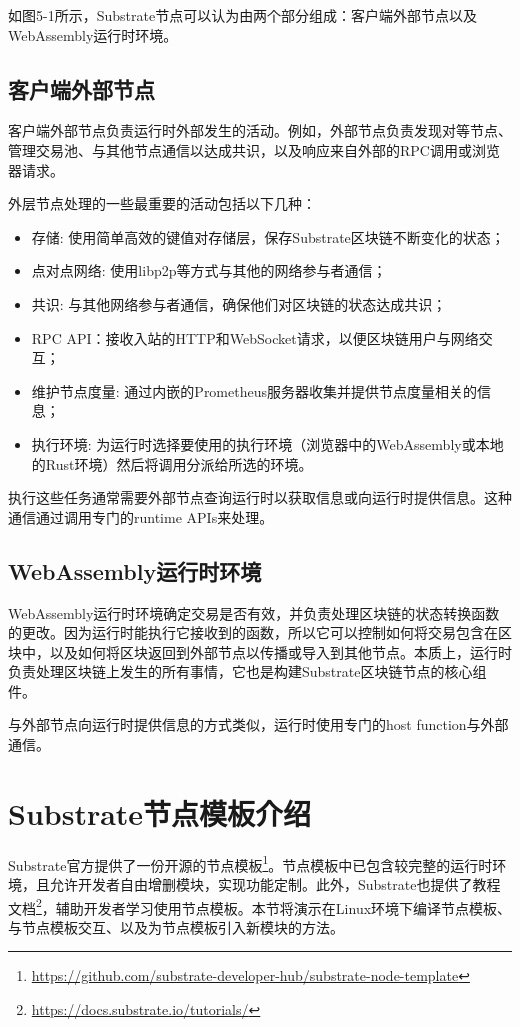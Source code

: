 如图5-1所示，Substrate节点可以认为由两个部分组成：客户端外部节点以及WebAssembly运行时环境。

\subsection{客户端外部节点}

客户端外部节点负责运行时外部发生的活动。例如，外部节点负责发现对等节点、管理交易池、与其他节点通信以达成共识，以及响应来自外部的RPC调用或浏览器请求。

外层节点处理的一些最重要的活动包括以下几种：

\begin{itemize}
    \item 存储: 使用简单高效的键值对存储层，保存Substrate区块链不断变化的状态；
    \item 点对点网络: 使用libp2p等方式与其他的网络参与者通信；
    \item 共识: 与其他网络参与者通信，确保他们对区块链的状态达成共识；
    \item RPC API：接收入站的HTTP和WebSocket请求，以便区块链用户与网络交互；
    \item 维护节点度量: 通过内嵌的Prometheus服务器收集并提供节点度量相关的信息；
    \item 执行环境: 为运行时选择要使用的执行环境（浏览器中的WebAssembly或本地的Rust环境）然后将调用分派给所选的环境。
\end{itemize}

执行这些任务通常需要外部节点查询运行时以获取信息或向运行时提供信息。这种通信通过调用专门的runtime APIs来处理。

\subsection{WebAssembly运行时环境}

WebAssembly运行时环境确定交易是否有效，并负责处理区块链的状态转换函数的更改。因为运行时能执行它接收到的函数，所以它可以控制如何将交易包含在区块中，以及如何将区块返回到外部节点以传播或导入到其他节点。本质上，运行时负责处理区块链上发生的所有事情，它也是构建Substrate区块链节点的核心组件。

与外部节点向运行时提供信息的方式类似，运行时使用专门的host function与外部通信。

\section{Substrate节点模板介绍}

Substrate官方提供了一份开源的节点模板\footnote{\url{https://github.com/substrate-developer-hub/substrate-node-template}}。节点模板中已包含较完整的运行时环境，且允许开发者自由增删模块，实现功能定制。此外，Substrate也提供了教程文档\footnote{\url{https://docs.substrate.io/tutorials/}}，辅助开发者学习使用节点模板。本节将演示在Linux环境下编译节点模板、与节点模板交互、以及为节点模板引入新模块的方法。

